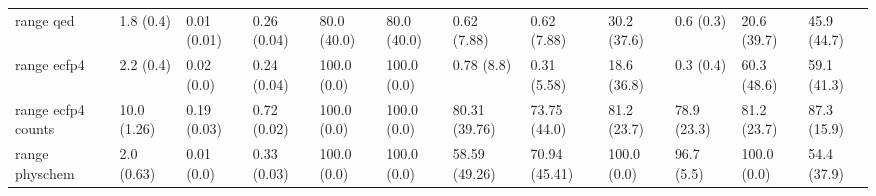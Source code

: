 \begin{tabular}{llllllllllll}
range qed & {\cellcolor[HTML]{F5FBFC}} \color[HTML]{000000} 1.8 (0.4) & {\cellcolor[HTML]{F6FCFD}} \color[HTML]{000000} 0.01 (0.01) & {\cellcolor[HTML]{43AF78}} \color[HTML]{F1F1F1} 0.26 (0.04) & {\cellcolor[HTML]{00441B}} \color[HTML]{F1F1F1} 80.0 (40.0) & {\cellcolor[HTML]{00441B}} \color[HTML]{F1F1F1} 80.0 (40.0) & {\cellcolor[HTML]{F6FCFD}} \color[HTML]{000000} 0.62 (7.88) & {\cellcolor[HTML]{F6FCFD}} \color[HTML]{000000} 0.62 (7.88) & {\cellcolor[HTML]{D6F0EE}} \color[HTML]{000000} 30.2 (37.6) & {\cellcolor[HTML]{F6FCFD}} \color[HTML]{000000} 0.6 (0.3) & {\cellcolor[HTML]{F6FCFD}} \color[HTML]{000000} 20.6 (39.7) & {\cellcolor[HTML]{137D39}} \color[HTML]{F1F1F1} 45.9 (44.7) \\
range ecfp4 & {\cellcolor[HTML]{F4FBFC}} \color[HTML]{000000} 2.2 (0.4) & {\cellcolor[HTML]{F7FCFD}} \color[HTML]{000000} 0.02 (0.0) & {\cellcolor[HTML]{6FC6AA}} \color[HTML]{000000} 0.24 (0.04) & {\cellcolor[HTML]{00441B}} \color[HTML]{F1F1F1} 100.0 (0.0) & {\cellcolor[HTML]{00441B}} \color[HTML]{F1F1F1} 100.0 (0.0) & {\cellcolor[HTML]{F6FCFD}} \color[HTML]{000000} 0.78 (8.8) & {\cellcolor[HTML]{F7FCFD}} \color[HTML]{000000} 0.31 (5.58) & {\cellcolor[HTML]{067230}} \color[HTML]{F1F1F1} 18.6 (36.8) & {\cellcolor[HTML]{F0F9FB}} \color[HTML]{000000} 0.3 (0.4) & {\cellcolor[HTML]{0A7633}} \color[HTML]{F1F1F1} 60.3 (48.6) & {\cellcolor[HTML]{00441B}} \color[HTML]{F1F1F1} 59.1 (41.3) \\
range ecfp4 counts & {\cellcolor[HTML]{E9F7FA}} \color[HTML]{000000} 10.0 (1.26) & {\cellcolor[HTML]{F7FCFD}} \color[HTML]{000000} 0.19 (0.03) & {\cellcolor[HTML]{27904C}} \color[HTML]{F1F1F1} 0.72 (0.02) & {\cellcolor[HTML]{F7FCFD}} \color[HTML]{000000} 100.0 (0.0) & {\cellcolor[HTML]{F7FCFD}} \color[HTML]{000000} 100.0 (0.0) & {\cellcolor[HTML]{147E3A}} \color[HTML]{F1F1F1} 80.31 (39.76) & {\cellcolor[HTML]{268F4A}} \color[HTML]{F1F1F1} 73.75 (44.0) & {\cellcolor[HTML]{005F26}} \color[HTML]{F1F1F1} 81.2 (23.7) & {\cellcolor[HTML]{005B25}} \color[HTML]{F1F1F1} 78.9 (23.3) & {\cellcolor[HTML]{00441B}} \color[HTML]{F1F1F1} 81.2 (23.7) & {\cellcolor[HTML]{00441B}} \color[HTML]{F1F1F1} 87.3 (15.9) \\
range physchem & {\cellcolor[HTML]{F4FBFC}} \color[HTML]{000000} 2.0 (0.63) & {\cellcolor[HTML]{F7FCFD}} \color[HTML]{000000} 0.01 (0.0) & {\cellcolor[HTML]{53B88C}} \color[HTML]{F1F1F1} 0.33 (0.03) & {\cellcolor[HTML]{F7FCFD}} \color[HTML]{000000} 100.0 (0.0) & {\cellcolor[HTML]{F7FCFD}} \color[HTML]{000000} 100.0 (0.0) & {\cellcolor[HTML]{4CB484}} \color[HTML]{F1F1F1} 58.59 (49.26) & {\cellcolor[HTML]{2D9655}} \color[HTML]{F1F1F1} 70.94 (45.41) & {\cellcolor[HTML]{00441B}} \color[HTML]{F1F1F1} 100.0 (0.0) & {\cellcolor[HTML]{B2E2D7}} \color[HTML]{000000} 96.7 (5.5) & {\cellcolor[HTML]{005C25}} \color[HTML]{F1F1F1} 100.0 (0.0) & {\cellcolor[HTML]{D7F0EE}} \color[HTML]{000000} 54.4 (37.9) \\

\end{tabular}
